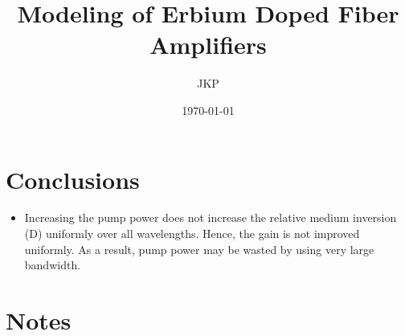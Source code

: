 \documentclass[a4paper]{article}
\title{Modeling of Erbium Doped Fiber Amplifiers}
\author{JKP}
\date{\today}
\begin{document}
\maketitle


\section{Conclusions}
\begin{itemize}
	\item Increasing the pump power does not increase the relative medium inversion (D) uniformly over all wavelengths. Hence, the gain is not improved uniformly. As a result, pump power may be wasted by using very large bandwidth.
\end{itemize}


\section{Notes}
\end{document}
